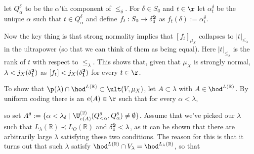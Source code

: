 let $Q_\alpha^\delta$ to be the $\alpha$'th component of $\leq_\delta$. For $\delta\in S_0$ and $t\in\r$ let $\alpha_t^\delta$ be the unique $\alpha$ such that $t\in Q_\alpha^\delta$ and define $f_t:S_0\to\bf\delta^2_1$ as $f_t(\delta):=\alpha_t^\delta$.



Now the key thing is that strong normality implies that $[f_t]_{\mu_X}$ collapses to $|t|_{\leq_\lambda}$ in the ultrapower (so that we can think of them as being equal). Here $|t|_{\leq_\lambda}$ is the rank of $t$ with respect to $\leq_\lambda$. This shows that, given that $\mu_X$ is strongly normal, $\lambda<j_X({\bf\delta^2_1})$ as $[f_t]<j_X({\bf\delta^2_1})$ for every $t\in\r$.

\qquad To show that $\p(\lambda)\cap\hod^{L(\mathbb R)}\subset\ult(V,\mu_X)$, let $A\subset\lambda$ with $A\in\hod^{L(\mathbb R)}$. By uniform coding there is an $e(A)\in\r$ such that for every $\alpha<\lambda$,

so set $A^\delta:=\{\alpha<\lambda_\delta\mid\U^{(2)}_{e(A)}(Q_{<\alpha}^\delta,Q_\alpha^\delta)\neq\emptyset\}$. Assume that we've picked our $\lambda$ such that $L_\lambda(\mathbb R)\prec L_\Theta(\mathbb R)$ and ${\bf\delta^2_1}<\lambda$, as it can be shown that there are arbitrarily large $\lambda$ satisfying these two conditions. The reason for this is that it turns out that such $\lambda$ satisfy $\hod^{L(\mathbb R)}\cap V_\lambda=\hod^{L_\lambda(\mathbb R)}$, so that

